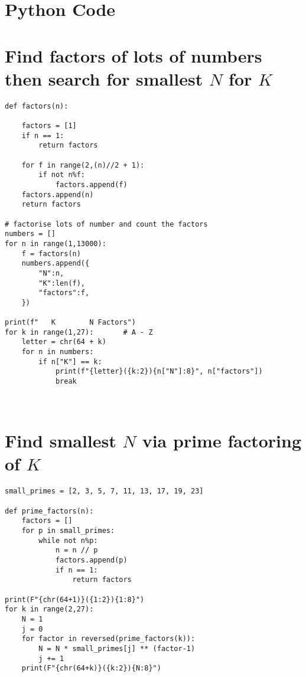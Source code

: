 \documentclass{article}
\begin{document}
\pagebreak

\section*{Python Code}
\section*{Find factors of lots of numbers then search for smallest $N$ for $K$}
\begin{verbatim}
def factors(n):
    
    factors = [1]
    if n == 1:
        return factors

    for f in range(2,(n)//2 + 1):
        if not n%f:
            factors.append(f)
    factors.append(n)
    return factors

# factorise lots of number and count the factors
numbers = []
for n in range(1,13000):
    f = factors(n) 
    numbers.append({
        "N":n,
        "K":len(f),
        "factors":f,
    })    

print(f"   K        N Factors")
for k in range(1,27):       # A - Z
    letter = chr(64 + k)
    for n in numbers:
        if n["K"] == k:
            print(f"{letter}({k:2}){n["N"]:8}", n["factors"])
            break



\end{verbatim}
\section*{Find smallest $N$ via prime factoring of $K$}

\begin{verbatim}
small_primes = [2, 3, 5, 7, 11, 13, 17, 19, 23]

def prime_factors(n):
    factors = []
    for p in small_primes:
        while not n%p:
            n = n // p
            factors.append(p)
            if n == 1:
                return factors

print(F"{chr(64+1)}({1:2}){1:8}")
for k in range(2,27):
    N = 1
    j = 0
    for factor in reversed(prime_factors(k)):
        N = N * small_primes[j] ** (factor-1)
        j += 1
    print(F"{chr(64+k)}({k:2}){N:8}")
\end{verbatim}
\end{document}
